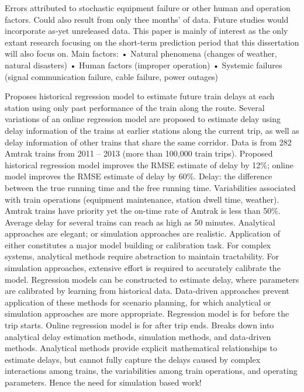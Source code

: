 \documentclass{article}
\begin{document}
Errors attributed to stochastic equipment failure or other human and operation factors. Could also result from only thee months’ of data. Future studies would incorporate as-yet unreleased data. This paper is mainly of interest as the only extant research focusing on the short-term prediction period that this dissertation will also focus on.
Main factors:
•	Natural phenomena (changes of weather, natural disasters)
•	Human factors (improper operation)
•	Systemic failures (signal communication failure, cable failure, power outages)

\cite{wang_and_work_2015}

Proposes historical regression model to estimate future train delays at each station using only past performance of the train along the route. 
Several variations of an online regression model are proposed to estimate delay using delay information of the trains at earlier stations along the current trip, as well as delay information of other trains that share the same corridor.
Data is from 282 Amtrak trains from 2011 – 2013 (more than 100,000 train trips). Proposed historical regression model improves the RMSE estimate of delay by 12\%; online model improves the RMSE estimate of delay by 60\%.
Delay: the difference between the true running time and the free running time.
Variabilities associated with train operations (equipment maintenance, station dwell time, weather). Amtrak trains have priority yet the on-time rate of Amtrak is less than 50\%. Average delay for several trains can reach as high as 50 minutes.
Analytical approaches are elegant; or simulation approaches are realistic. Application of either constitutes a major model building or calibration task. For complex systems, analytical methods require abstraction to maintain tractability. For simulation approaches, extensive effort is required to accurately calibrate the model. 
Regression models can be constructed to estimate delay, where parameters are calibrated by learning from historical data. Data-driven approaches prevent application of these methods for scenario planning, for which analytical or simulation approaches are more appropriate. 
Regression model is for before the trip starts. Online regression model is for after trip ends. 
Breaks down into analytical delay estimation methods, simulation methods, and data-driven methods. 
Analytical methods provide explicit mathematical relationships to estimate delays, but cannot fully capture the delays caused by complex interactions among trains, the variabilities among train operations, and operating parameters. Hence the need for simulation based work!
\end{document}
